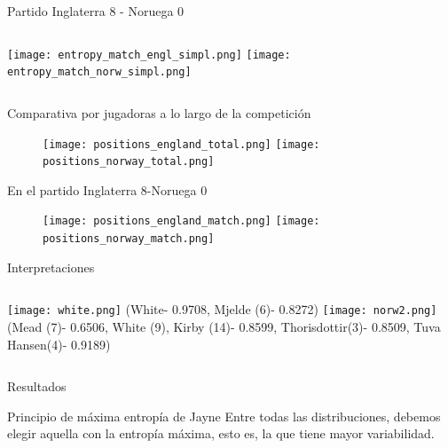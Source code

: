 \documentclass{beamer}
\begin{document}
\begin{frame}{Partido Inglaterra 8 - Noruega 0}
		\begin{columns}[t]
			\texttt{[image: entropy\_match\_engl\_simpl.png]}
			\texttt{[image: entropy\_match\_norw\_simpl.png]}
		\end{columns} 
\end{frame}

\begin{frame}{Comparativa por jugadoras a lo largo de la competición}
	\begin{figure}
		\centering
			\texttt{[image: positions\_england\_total.png]}
			\texttt{[image: positions\_norway\_total.png]}
		\end{figure}
\end{frame}

\begin{frame}{En el partido Inglaterra 8-Noruega 0}
	\begin{figure}
		\centering
			\texttt{[image: positions\_england\_match.png]}
			\texttt{[image: positions\_norway\_match.png]}
		\end{figure}
\end{frame}

\begin{frame}{Interpretaciones}
	\begin{columns}[t]
		\texttt{[image: white.png]}
		\footnotesize(White- 0.9708, Mjelde (6)- 0.8272)
		\texttt{[image: norw2.png]}
		\footnotesize(Mead (7)- 0.6506, White (9), Kirby (14)- 0.8599, Thorisdottir(3)- 0.8509, Tuva Hansen(4)- 0.9189)
	\end{columns} 
\end{frame}

\begin{frame}{Resultados}
	\begin{alertblock}{Principio de máxima entropía de Jayne}
		Entre todas las distribuciones, debemos elegir aquella con la entropía máxima, esto es, 
		la que tiene mayor variabilidad.
	\end{alertblock}
	\begin{figure}
		\centering
	\end{figure}
\end{frame}
\end{document}
